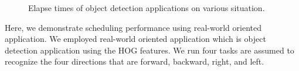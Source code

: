 \begin{figure}[!t]
\begin{minipage}[t]{0.33\hsize}
\begin{center}
\label{fig:real-prio_band}
\label{fig:real-prio_band-hiload}
\end{center}
\end{minipage}
\begin{minipage}[t]{0.33\hsize}
\begin{center}
\label{fig:real-null_null-hiload}
\label{fig:real-prio_band_cpu-hiload}
\end{center}
\end{minipage}
\caption{Elapse times of object detection applications on various situation.}
\label{fig:elapse_time_all}
\end{figure}

Here, we demonstrate scheduling performance using real-world oriented application.
We employed real-world oriented application which is object detection application using the HOG features.
We run four tasks are assumed to recognize the four directions that are forward, backward, right, and left.


